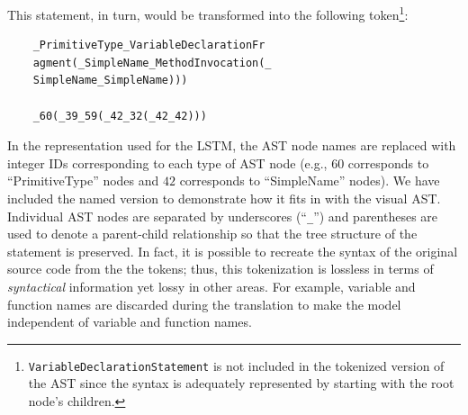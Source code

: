 \documentclass{article}
\begin{document}
This statement, in turn, would be transformed into the following token\footnote{
\texttt{VariableDeclarationStatement} is not included in the
tokenized version of the AST since the syntax is adequately represented
by starting with the root node's children.}:


\begin{verbatim}
    _PrimitiveType_VariableDeclarationFr
    agment(_SimpleName_MethodInvocation(_
    SimpleName_SimpleName)))

    _60(_39_59(_42_32(_42_42)))
\end{verbatim}

In the representation used for the LSTM, the AST node names are replaced with
integer IDs corresponding to each type of AST node
(e.g., $60$ corresponds to ``PrimitiveType'' nodes and $42$ corresponds to
``SimpleName'' nodes).
We have included the named version to demonstrate
how it fits in with the visual AST.  Individual AST nodes are
separated by underscores (``\texttt{\_}'') and parentheses are used
to denote a parent-child relationship so that the tree structure of
the statement is preserved. In fact, it is possible  to recreate the
syntax of the original source  code from the the tokens; thus, this 
tokenization is lossless in terms of  \textit{syntactical} information 
yet lossy in other areas. For example, variable and function names are
discarded during the translation to make the model independent of
variable and function names.
\end{document}
